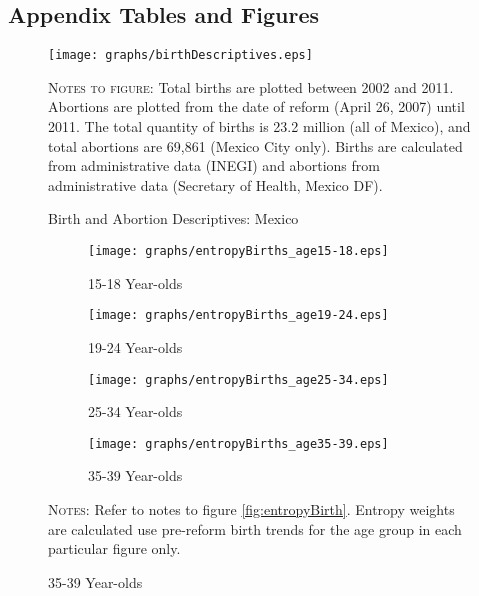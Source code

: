 \documentclass[a4paper,11pt]{article}
\begin{document}
\begin{spacing}{1}
\clearpage
\setcounter{table}{0}
\renewcommand{\thetable}{A\arabic{table}}
\setcounter{figure}{0}
\renewcommand{\thefigure}{A\arabic{figure}}
\appendix
\section{Appendix Tables and Figures}
\begin{figure}[h!]
  \begin{center}
  \texttt{[image: graphs/birthDescriptives.eps]}
  \caption{Birth and Abortion Descriptives: Mexico}
  \label{MexBirthAbort}
  \end{center}
  \vspace{2mm}
         {\footnotesize \textsc{Notes to figure}: Total births are plotted between
           2002 and 2011.
    Abortions are plotted from the date of reform (April 26, 2007) until 2011.
    The total quantity of births is 23.2 million (all of Mexico), and total
    abortions are 69,861 (Mexico City only).  Births are calculated from
    administrative data (INEGI) and abortions from administrative data (Secretary
    of Health, Mexico DF).}
\end{figure}
\vspace{2cm}


%
%

\begin{landscape}
  
\end{landscape}
\begin{landscape}
  
\end{landscape}


\begin{figure}[htpb!]
  \caption{Age-Specific Entropy-Weighted Trends in Births}
  \begin{center}
    \begin{subfigure}{0.45\textwidth}
      \texttt{[image: graphs/entropyBirths\_age15-18.eps]}
      \caption{15-18 Year-olds}
    \end{subfigure}
    \begin{subfigure}{0.45\textwidth}
      \texttt{[image: graphs/entropyBirths\_age19-24.eps]}
      \caption{19-24 Year-olds}
    \end{subfigure}
    \begin{subfigure}{0.45\textwidth}
      \texttt{[image: graphs/entropyBirths\_age25-34.eps]}
      \caption{25-34 Year-olds}
    \end{subfigure}
    \begin{subfigure}{0.45\textwidth}
      \texttt{[image: graphs/entropyBirths\_age35-39.eps]}
      \caption{35-39 Year-olds}
    \end{subfigure}
  \end{center}
  \textsc{Notes:} Refer to notes to figure \ref{fig:entropyBirth}.
  Entropy weights are calculated use pre-reform birth trends for
  the age group in each particular figure only.
\end{figure}




\end{spacing}
\end{document}
